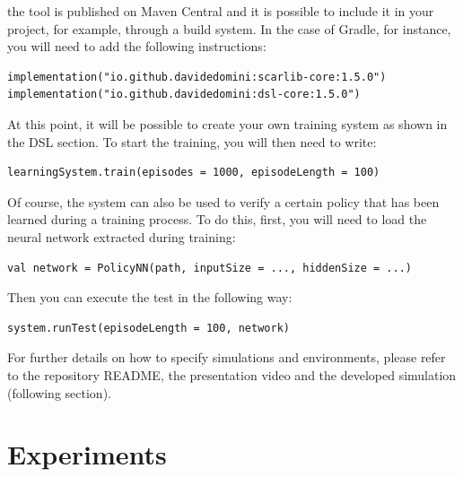 the tool is published on Maven Central 
 and it is possible to include it in your project, 
 for example, through a build system. 
 In the case of Gradle, for instance, 
 you will need to add the following instructions:
\begin{lstlisting}
implementation("io.github.davidedomini:scarlib-core:1.5.0")
implementation("io.github.davidedomini:dsl-core:1.5.0")
\end{lstlisting}
%
At this point, it will be possible to create 
 your own training system as shown in the DSL section. 
 To start the training, you will then need to write:
\begin{lstlisting}
learningSystem.train(episodes = 1000, episodeLength = 100)
\end{lstlisting}
%
Of course, 
 the system can also be used to verify a certain 
 policy that has been learned during a training process. 
% 
To do this, first, 
 you will need to load the neural network extracted during training:
\begin{lstlisting}
val network = PolicyNN(path, inputSize = ..., hiddenSize = ...)
\end{lstlisting}
Then you can execute the test in the following way:
\begin{lstlisting}
system.runTest(episodeLength = 100, network)
\end{lstlisting}
For further details on how to specify simulations and environments, 
 please refer to the repository README, 
 the presentation video and 
 the developed simulation (following section).
\section{Experiments}\label{experiments}

